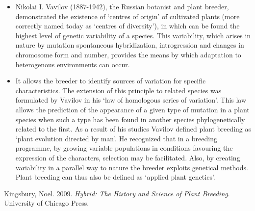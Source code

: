 \documentclass[11pt,ignorenonframetext,aspectratio=169]{beamer}
\newlength{\cslhangindent}
\newenvironment{cslreferences}%
    {\setlength{\parindent}{0pt}%
    \everypar{\setlength{\hangindent}{\cslhangindent}}\ignorespaces}%
    {\par}
\begin{document}
\begin{frame}{}
\protect\hypertarget{section-11}{}
\begin{itemize}
\item
  Nikolai I. Vavilov (1887-1942), the Russian botanist and plant
  breeder, demonstrated the existence of `centres of origin' of
  cultivated plants (more correctly named today as `centres of
  diversity'), in which can be found the highest level of genetic
  variability of a species. This variability, which arises in nature by
  mutation spontaneous hybridization, introgression and changes in
  chromosome form and number, provides the means by which adaptation to
  heterogenous environments can occur.
\item
  It allows the breeder to identify sources of variation for specific
  characteristics. The extension of this principle to related species
  was formulated by Vavilov in his `law of homologous series of
  variation'. This law allows the prediction of the appearance of a
  given type of mutation in a plant species when such a type has been
  found in another species phylogenetically related to the first. As a
  result of his studies Vavilov defined plant breeding as `plant
  evolution directed by man'. He recognized that in a breeding
  programme, by growing variable populations in conditions favouring the
  expression of the characters, selection may be facilitated. Also, by
  creating variability in a parallel way to nature the breeder exploits
  genetical methods. Plant breeding can thus also be defined as `applied
  plant genetics'.
\end{itemize}

\hypertarget{refs}{}
\begin{cslreferences}
\leavevmode\hypertarget{ref-kingsbury2009hybrid}{}%
Kingsbury, Noel. 2009. \emph{Hybrid: The History and Science of Plant
Breeding}. University of Chicago Press.
\end{cslreferences}
\end{frame}
\end{document}

